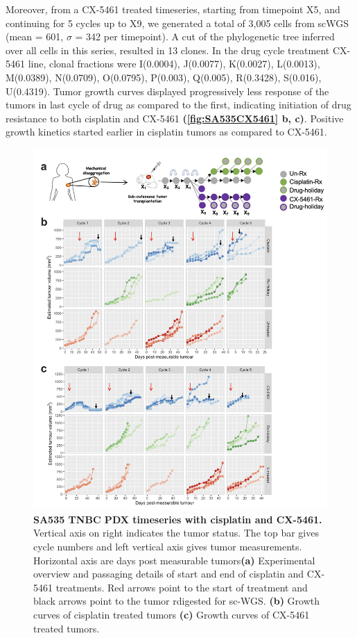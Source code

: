 Moreover, from a CX-5461 treated timeseries, starting from timepoint X5, and continuing for 5 cycles up to X9, we generated a total of 3,005 cells from scWGS (mean = 601, $\sigma$ = 342 per timepoint). A cut of the phylogenetic tree inferred over all cells in this series, resulted in 13 clones. In the drug cycle treatment CX-5461 line, clonal fractions were I(0.0004), J(0.0077), K(0.0027), L(0.0013), M(0.0389), N(0.0709),  O(0.0795), P(0.003), Q(0.005), R(0.3428), S(0.016), U(0.4319).
Tumor growth curves displayed progressively less response of the tumors in last cycle of drug as compared to the first, indicating initiation of drug resistance to both cisplatin and CX-5461 \textbf{(\autoref{fig:SA535CX5461} b, c)}. Positive growth kinetics started earlier in cisplatin tumors as compared to CX-5461.

\begin{figure}
\centering
\includegraphics[width=\textwidth]{Figures/chap4/SA535CX5461.png}
	
\caption[SA535 TNBC PDX timeseries with cisplatin and CX-5461]
	{\small
 \textbf{SA535 TNBC PDX timeseries with cisplatin and CX-5461.}
Vertical axis on right indicates the tumor status. The top bar gives cycle numbers and left vertical axis gives tumor measurements. Horizontal axis are days post measurable tumors\textbf{(a)} Experimental overview and passaging details of start and end of cisplatin and CX-5461 treatments. Red arrows point to the start of treatment and black arrows point to the tumor rdigested for sc-WGS.
	   \textbf{(b)} Growth curves of cisplatin treated tumors
	    \textbf{(c)} Growth curves of CX-5461 treated tumors.
	}
	\label{fig:SA535CX5461}
\end{figure}

